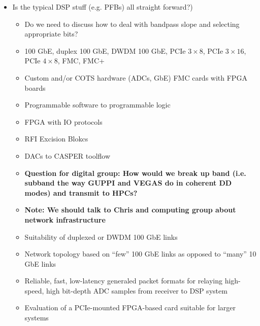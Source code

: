 \documentclass[10pt]{myNSF}
\begin{document}
\begin{itemize}
\item{Is the typical DSP stuff (e.g. PFBs) all straight forward?)}


\begin{itemize}
\item{Do we need to discuss how to deal with bandpass slope and
    selecting appropriate bits?}
\end{itemize}


\begin{itemize}
\item{100 GbE, duplex 100 GbE, DWDM 100 GbE, PCIe $3 \times 8$, PCIe
    $3 \times 16$, PCIe $4 \times 8$, FMC, FMC+}
\end{itemize}


\begin{itemize}
\item{Custom and/or COTS hardware (ADCs, GbE) FMC cards with FPGA boards}
\item{Programmable software to programmable logic}
\item{FPGA with IO protocols}
\item{RFI Excision Blokcs}
\item{DACs to CASPER toolflow}
\end{itemize}


\begin{itemize}
  \item{\textbf{Question for digital group: How would we break up band
        (i.e. subband the way GUPPI and VEGAS do in coherent DD modes)
        and transmit to HPCs?}}
  \item{\textbf{Note: We should talk to Chris and computing group
        about network infrastructure}}
\item{Suitability of duplexed or DWDM 100 GbE links}
\item{Network topology based on ``few'' 100 GbE links as opposed to
    ``many'' 10 GbE links}
\item{Reliable, fast, low-latency generaled packet formats for
    relaying high-speed, high bit-depth ADC samples from receiver to
    DSP system}
\item{Evaluation of a PCIe-mounted FPGA-based card suitable for larger
    systems}
\end{itemize}



\end{itemize}
\end{document}
